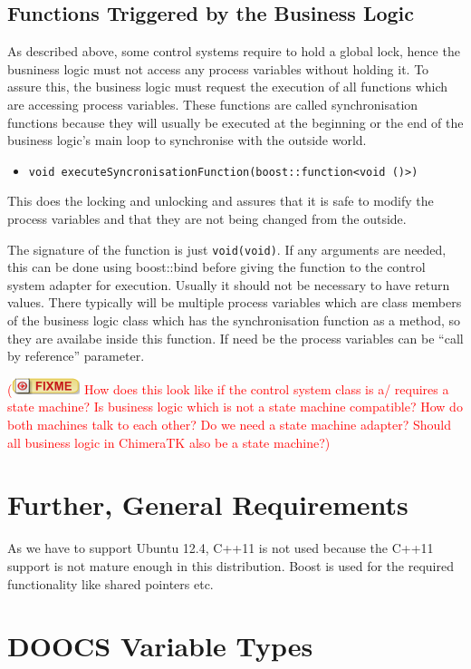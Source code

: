 \documentclass[11pt,a4paper]{scrartcl}
\newcounter{nFixmes}
\newcommand{\fixme}[1]{\addtocounter{nFixmes}{1}\textcolor{red}{(\includegraphics[height=2ex]{fixme} #1)}\xspace}
\begin{document}
\subsection{Functions Triggered by the Business Logic}
As described above, some control systems require to hold a global lock, hence the busniness logic
must not access any process variables without holding it. To assure this, the business logic must
request the execution of all functions which are accessing process variables. These functions are called
synchronisation functions because they will usually be executed at the beginning or the end of 
the business logic's main loop to synchronise with the outside world.

\begin{itemize}
  \item \texttt{void executeSyncronisationFunction(boost::function<void ()>)}
\end{itemize}
This does the locking and unlocking and assures that
it is safe to modify the process variables and that they are not being changed
from the outside.

The signature of the function is just \texttt{void(void)}. If any arguments are needed, this can be done
using boost::bind before giving the function to the control system adapter for execution. Usually it
should not be necessary to have return values. There typically will be multiple process variables which
are class members of the business logic class which has the synchronisation function as a method, so
they are availabe inside this function. If need be the process variables can be ``call by reference''
parameter.

\fixme{How does this look like if the control system class is a/ requires a state machine?
Is business logic which is not a state machine compatible? How do both machines talk to each other?
Do we need a state machine adapter? Should all business logic in ChimeraTK also be a state machine?}

\section{Further, General Requirements}
As we have to support Ubuntu 12.4, C++11 is not used because the C++11 support
is not mature enough in this distribution. Boost is used for the required
functionality like shared pointers etc.

\appendix
\section{DOOCS Variable Types}
\end{document}
